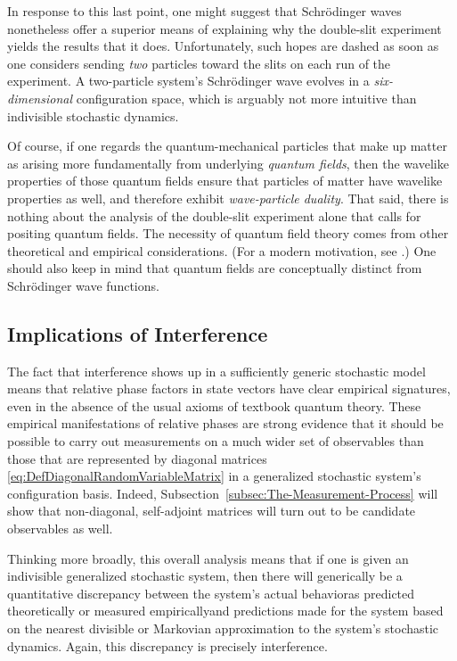 \documentclass[12pt,english,prl,superscriptaddress,nobibnotes,nofootinbib]{revtex4-2}
\begin{document}
In response to this last point, one might suggest that Schr{\" o}dinger
waves nonetheless offer a superior means of explaining why the double-slit
experiment yields the results that it does. Unfortunately, such hopes
are dashed as soon as one considers sending \emph{two} particles toward
the slits on each run of the experiment. A two-particle system's Schr{\" o}dinger
wave evolves in a \emph{six-dimensional} configuration space, which
is arguably not more intuitive than indivisible stochastic dynamics.

Of course, if one regards the quantum-mechanical particles that make
up matter as arising more fundamentally from underlying \emph{quantum fields},
then the wavelike properties of those quantum fields ensure that particles
of matter have wavelike properties as well, and therefore exhibit
\emph{wave-particle duality}. That said, there is nothing about the
analysis of the double-slit experiment alone that calls for positing
quantum fields. The necessity of quantum field theory comes from other
theoretical and empirical considerations. (For a modern motivation,
see \citep{Weinberg:1996tqtfi}.) One should also keep in mind that
quantum fields are conceptually distinct from Schr{\" o}dinger wave functions.

\subsection{Implications of Interference\label{subsec:Implications-of-Interference}}

The fact that interference shows up in a sufficiently generic stochastic
model means that relative phase factors in state vectors have clear
empirical signatures, even in the absence of the usual axioms of textbook
quantum theory. These empirical manifestations of relative phases
are strong evidence that it should be possible to carry out measurements
on a much wider set of observables than those that are represented
by diagonal matrices \eqref{eq:DefDiagonalRandomVariableMatrix} in
a generalized stochastic system's configuration basis. Indeed, Subsection~\ref{subsec:The-Measurement-Process}
will show that non-diagonal, self-adjoint matrices will turn out to
be candidate observables as well.

Thinking more broadly, this overall analysis means that if one is
given an indivisible generalized stochastic system, then there will
generically be a quantitative discrepancy between the system's actual
behavior\textemdash as predicted theoretically or measured empirically\textemdash and
predictions made for the system based on the nearest divisible or
Markovian approximation to the system's stochastic dynamics. Again,
this discrepancy is precisely interference.
\end{document}
